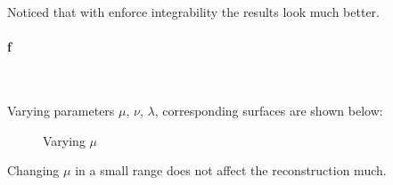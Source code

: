 \documentclass[11pt]{article} \usepackage{fullpage} \usepackage{graphicx} \usepackage{epstopdf} \usepackage{color} \usepackage{psfrag} \usepackage{pdfsync}\usepackage{indentfirst}\usepackage{subfigure}\usepackage{float}\usepackage[section]{placeins}
\begin{document}
Noticed that with enforce integrability the results look much better.

\paragraph{f}~{}

Varying parameters $\mu$, $\nu$, $\lambda$, corresponding surfaces are shown below:
\begin{figure}[H]
\centering
{}
\caption{Varying $\mu$}
\end{figure}

Changing $\mu$ in a small range does not affect the reconstruction much.
\end{document}
